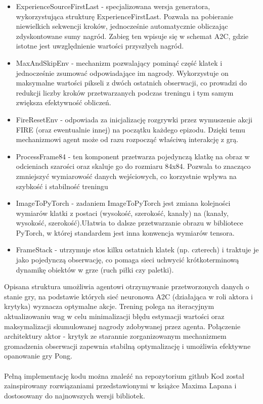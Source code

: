 \documentclass[a4paper, 12pt]{article}
\numberwithin{equation}{section}
\begin{document}
\begin{itemize}
        \item ExperienceSourceFirstLast - specjalizowana wersja generatora, wykorzystująca strukturę ExperienceFirstLast. Pozwala na pobieranie niewielkich sekwencji kroków, jednocześnie automatycznie obliczając zdyskontowane sumy nagród. Zabieg ten wpisuje się w schemat A2C, gdzie istotne jest uwzględnienie wartości przyszłych nagród.
        \item MaxAndSkipEnv - mechanizm pozwalający pominąć część klatek i jednocześnie zsumować odpowiadające im nagrody. Wykorzystuje on maksymalne wartości pikseli z dwóch ostatnich obserwacji, co prowadzi do redukcji liczby kroków przetwarzanych podczas treningu i tym samym zwiększa efektywność obliczeń.
        \item FireResetEnv - odpowiada za inicjalizację rozgrywki przez wymuszenie akcji FIRE (oraz ewentualnie innej) na początku każdego epizodu. Dzięki temu mechanizmowi agent może od razu rozpocząć właściwą interakcję z grą.
        \item ProcessFrame84 - ten komponent przetwarza pojedynczą klatkę na obraz w odcieniach szarości oraz skaluje go do rozmiaru 84x84. Pozwala to znacząco zmniejszyć wymiarowość danych wejściowych, co korzystnie wpływa na szybkość i stabilność treningu
        \item ImageToPyTorch - zadaniem ImageToPyTorch jest zmiana kolejności wymiarów klatki z postaci (wysokość, szerokość, kanały) na (kanały, wysokość, szerokość).Ułatwia to dalsze przetwarzanie obrazu w bibliotece PyTorch, w której standardem jest inna konwencja wymiarów tensora.
        \item FrameStack - utrzymuje stos kilku ostatnich klatek (np. czterech) i traktuje je jako pojedynczą obserwację, co pomaga sieci uchwycić krótkoterminową dynamikę obiektów w grze (ruch piłki czy paletki).
    \end{itemize}
    Opisana struktura umożliwia agentowi otrzymywanie przetworzonych danych o stanie gry, na podstawie których sieć neuronowa A2C (działająca w roli aktora i krytyka) wyznacza optymalne akcje. Trening polega na iteracyjnym aktualizowaniu wag w celu minimalizacji błędu estymacji wartości oraz maksymalizacji skumulowanej nagrody zdobywanej przez agenta. Połączenie architektury aktor - krytyk ze starannie zorganizowanym mechanizmem gromadzenia obserwacji zapewnia stabilną optymalizację i umożliwia efektywne opanowanie gry Pong.
    \\ \\ 
    Pełną implementację kodu można znaleźć na repozytorium github \cite{A2C}
    Kod został zainspirowany rozwiązaniami przedstawionymi w książce Maxima Lapana \cite{lapan2020deep} i dostosowany do najnowszych wersji bibliotek.
\end{document}
